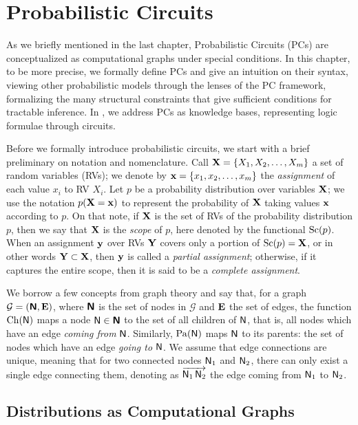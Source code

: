 \chapter{Probabilistic Circuits}
\label{ch:pc}

As we briefly mentioned in the last chapter, Probabilistic Circuits (PCs) are conceptualized as
computational graphs under special conditions. In this chapter,  to be more precise,
we formally define PCs and give an intuition on their syntax, viewing other probabilistic models
through the lenses of the PC framework, formalizing the many structural constraints that give
sufficient conditions for tractable inference. In , we address PCs as knowledge
bases, representing logic formulae through circuits.

Before we formally introduce probabilistic circuits, we start with a brief preliminary on notation
and nomenclature. Call $\mathbf{X}=\{X_1,X_2,\ldots,X_m\}$ a set of random variables (RVs); we denote
by $\mathbf{x}=\{x_1,x_2,\ldots,x_m\}$ the \emph{assignment} of each value $x_i$ to RV $X_i$. Let $p$
be a probability distribution over variables $\mathbf{X}$; we use the notation $p(\mathbf{X}=\mathbf{x})$ to
represent the probability of $\mathbf{X}$ taking values $\mathbf{x}$ according to $p$. On that note, if
$\mathbf{X}$ is the set of RVs of the probability distribution $p$, then we say that $\mathbf{X}$ is the
\emph{scope} of $p$, here denoted by the functional $\operatorname*{\normalfont{Sc}}(p)$. When an assignment $\mathbf{y}$ over RVs
$\mathbf{Y}$ covers only a portion of $\operatorname*{\normalfont{Sc}}(p)=\mathbf{X}$, or in other words $\mathbf{Y}\subset\mathbf{X}$,
then $\mathbf{y}$ is called a \emph{partial assignment}; otherwise, if it captures the entire scope,
then it is said to be a \emph{complete assignment}.

We borrow a few concepts from graph theory and say that, for a graph
$\mathcal{G}=(\operatorname{\textup{\textsf{\textbf{N}}}},\mathbf{E})$, where $\operatorname{\textup{\textsf{\textbf{N}}}}$ is the set of nodes in $\mathcal{G}$ and $\mathbf{E}$
the set of edges, the function $\operatorname*{\normalfont{Ch}}(\operatorname{\textup{\textsf{N}}})$ maps a node $\operatorname{\textup{\textsf{N}}}\in\operatorname{\textup{\textsf{\textbf{N}}}}$ to the set of all children
of $\operatorname{\textup{\textsf{N}}}$, that is, all nodes which have an edge \emph{coming from} $\operatorname{\textup{\textsf{N}}}$. Similarly,
$\operatorname*{\normalfont{Pa}}(\operatorname{\textup{\textsf{N}}})$ maps $\operatorname{\textup{\textsf{N}}}$ to its parents: the set of nodes which have an edge \emph{going to}
$\operatorname{\textup{\textsf{N}}}$. We assume that edge connections are unique, meaning that for two connected nodes $\operatorname{\textup{\textsf{N}}}_1$
and $\operatorname{\textup{\textsf{N}}}_2$, there can only exist a single edge connecting them, denoting as
$\overrightarrow{\operatorname{\textup{\textsf{N}}}_1\operatorname{\textup{\textsf{N}}}_2}$ the edge coming from $\operatorname{\textup{\textsf{N}}}_1$ to $\operatorname{\textup{\textsf{N}}}_2$.

\section{Distributions as Computational Graphs}
\label{sec:pc}

